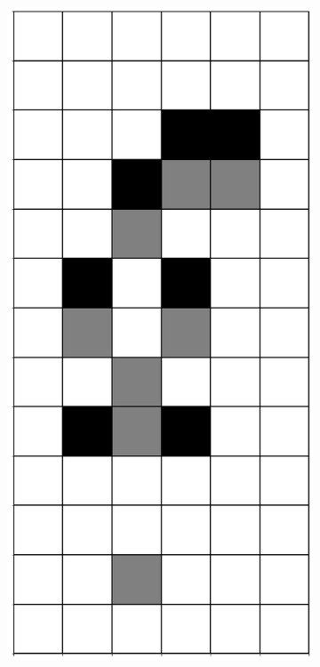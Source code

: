 \documentclass[12pt]{article}
\numberwithin{figure}{section} %
\begin{document}
\begin{figure}[H]
\begin{subfigure}{0.3\textwidth}
     \subcaption{}
   \end{subfigure}
     \begin{subfigure}{0.3\textwidth}
     \centering
     \includegraphics[angle=270,width=\linewidth]{Section4/9.1}

\end{subfigure}
\end{figure}
\end{document}
